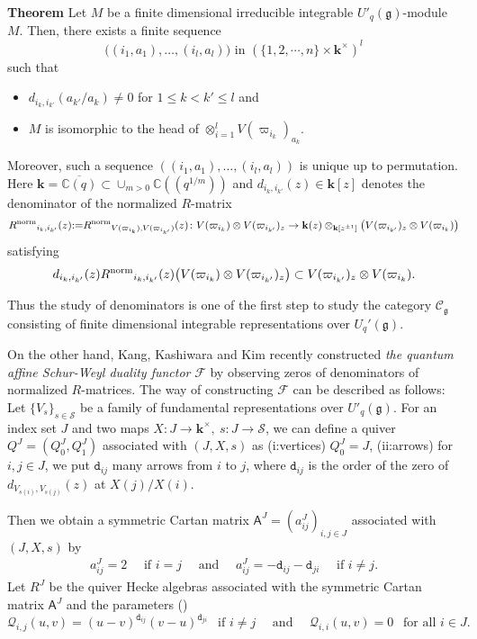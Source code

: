 \documentclass[11pt, leqno]{amsart}
\theoremstyle{definition}
\numberwithin{equation}{section}
\begin{document}
\noindent
\textbf{Theorem} \cite{AK,Kas02}
Let $M$ be a finite dimensional irreducible integrable $U'_q({\mathfrak g})$-module $M$. Then, there
exists a finite sequence $$\big( (i_1,a_1),\ldots, (i_l,a_l)\big) \text{ in }
( \{ 1,2,\cdots,n \} \times {\mathbf{k}}^\times)^l$$ such that
\begin{itemize}
\item $d_{i_k,i_{k'}}(a_{k'}/a_k) \not=0$ for $1\le k<k'\le l$ and
\item $M$ is isomorphic to the head of ${\mathop\otimes}_{i=1}^{l}V(\varpi_{i_k})_{a_k}$.
\end{itemize}
Moreover, such a sequence $\left((i_1,a_1),\ldots, (i_l,a_l)\right)$ is
unique up to permutation. Here ${\mathbf{k}} =\overline{{\mathbb C}(q)} \subset \cup_{m >0} {\mathbb C}((q^{1/m}))$ and $d_{i_k,i_{k'}}(z) \in {\mathbf{k}}[z]$
denotes the denominator of the normalized $R$-matrix
$${R^{\rm{norm}}}_{i_k,i_{k'}}(z){\mathbin{:=}}{R^{\rm{norm}}}_{V({\varpi}_{i_k}),V({\varpi}_{i_{k'}})}(z) \colon V({\varpi}_{i_k}) \otimes  V({\varpi}_{i_{k'}})_z \to {\mathbf{k}}(z) \otimes_{{\mathbf{k}}[z^{\pm 1}]} \big(V({\varpi}_{i_{k'}})_z \otimes V({\varpi}_{i_k}) \big)$$
satisfying
$$d_{i_k,i_{k'}}(z){R^{\rm{norm}}}_{i_k,i_{k'}}(z)\big(  V({\varpi}_{i_k}) \otimes  V({\varpi}_{i_{k'}})_z  \big) \subset V({\varpi}_{i_{k'}})_z \otimes V({\varpi}_{i_k}).$$
\medskip

Thus the study of denominators is one of the first step to study the category $\mathscr{C}_{\mathfrak g}$ consisting of finite dimensional integrable representations over
$U_q'({\mathfrak g})$.

On the other hand, Kang, Kashiwara and Kim \cite{KKK13a,KKK13b}
recently constructed {\it the quantum affine Schur-Weyl duality
functor} $\mathcal{F}$ by observing zeros of denominators of
normalized $R$-matrices. The way of constructing $\mathcal{F}$ can
be described as follows: Let $\{ V_s \}_{s \in \mathcal{S}}$ be a
family of fundamental representations over $U'_q({\mathfrak g})$. For an index
set $J$ and two maps $X:J \to {\mathbf{k}}^\times, \ s: J \to \mathcal{S}$,
we can define a quiver $Q^J=(Q^J_0,Q^J_1)$ associated with $(J,X,s)$
as (i:vertices) $Q^J_0= J$, (ii:arrows) for $i,j \in J$, we put
$\mathtt{d}_{ij}$ many arrows from $i$ to $j$, where
$\mathtt{d}_{ij}$ is the order of the zero of
$d_{V_{s(i)},V_{s(j)}}(z)$ at $X(j)/X(i)$.

Then we obtain a symmetric Cartan matrix ${\mathsf{A}}^J=(a^J_{ij})_{i,j \in J}$ associated with
$(J,X,s)$ by
\begin{align*}
a^J_{ij} = 2 \quad \text{ if } i =j \quad \text{ and } \quad a^J_{ij} = -\mathtt{d}_{ij}-\mathtt{d}_{ji} \quad \text{ if } i \ne j.
\end{align*}
Let $R^J$ be the quiver Hecke algebras associated with the symmetric Cartan matrix ${\mathsf{A}}^J$ and the parameters (\cite{KL09,KL11,R08})
$$ \mathcal{Q}_{i,j}(u,v) =(u-v)^{\mathtt{d}_{ij}}(v-u)^{\mathtt{d}_{ji}} \ \ \text{ if } i \ne j \quad \text{ and } \quad \mathcal{Q}_{i,i}(u,v)=0
\ \ \text{ for all } i \in J.$$
\end{document}
